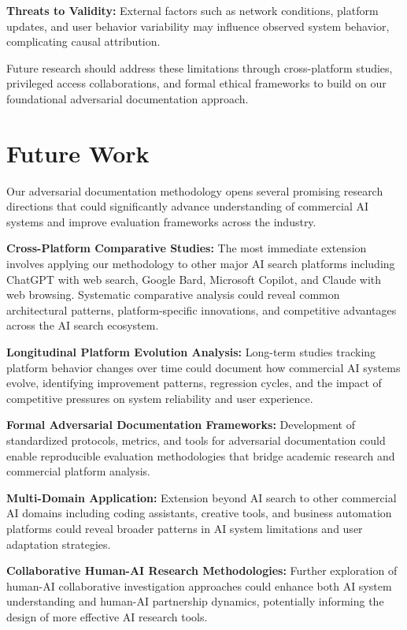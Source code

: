 \documentclass[12pt]{article}
\begin{document}
\textbf{Threats to Validity:} External factors such as network conditions, platform updates, and user behavior variability may influence observed system behavior, complicating causal attribution.

Future research should address these limitations through cross-platform studies, privileged access collaborations, and formal ethical frameworks to build on our foundational adversarial documentation approach.

\section{Future Work}

Our adversarial documentation methodology opens several promising research directions that could significantly advance understanding of commercial AI systems and improve evaluation frameworks across the industry.

\textbf{Cross-Platform Comparative Studies:} The most immediate extension involves applying our methodology to other major AI search platforms including ChatGPT with web search, Google Bard, Microsoft Copilot, and Claude with web browsing. Systematic comparative analysis could reveal common architectural patterns, platform-specific innovations, and competitive advantages across the AI search ecosystem.

\textbf{Longitudinal Platform Evolution Analysis:} Long-term studies tracking platform behavior changes over time could document how commercial AI systems evolve, identifying improvement patterns, regression cycles, and the impact of competitive pressures on system reliability and user experience.

\textbf{Formal Adversarial Documentation Frameworks:} Development of standardized protocols, metrics, and tools for adversarial documentation could enable reproducible evaluation methodologies that bridge academic research and commercial platform analysis.

\textbf{Multi-Domain Application:} Extension beyond AI search to other commercial AI domains including coding assistants, creative tools, and business automation platforms could reveal broader patterns in AI system limitations and user adaptation strategies.

\textbf{Collaborative Human-AI Research Methodologies:} Further exploration of human-AI collaborative investigation approaches could enhance both AI system understanding and human-AI partnership dynamics, potentially informing the design of more effective AI research tools.
\end{document}
